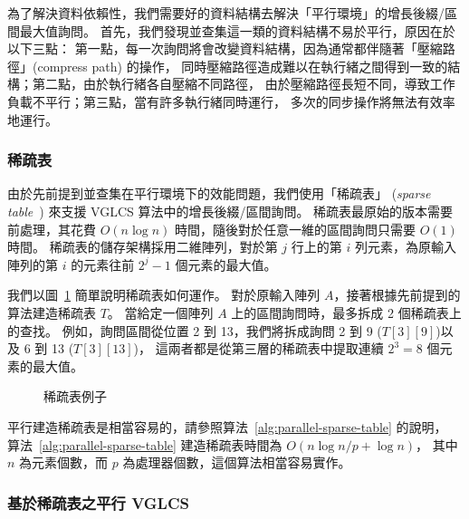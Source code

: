 為了解決資料依賴性，我們需要好的資料結構去解決「平行環境」的增長後綴/區間最大值詢問。
首先，我們發現並查集這一類的資料結構不易於平行，原因在於以下三點：
第一點，每一次詢問將會改變資料結構，因為通常都伴隨著「壓縮路徑」(compress path) 的操作，
同時壓縮路徑造成難以在執行緒之間得到一致的結構；第二點，由於執行緒各自壓縮不同路徑，
由於壓縮路徑長短不同，導致工作負載不平行；第三點，當有許多執行緒同時運行，
多次的同步操作將無法有效率地運行。

\subsubsection{稀疏表} \label{sec:sparse-table}

由於先前提到並查集在平行環境下的效能問題，我們使用「稀疏表」
({\em sparse table}~\cite{Berkman1993RecursiveSP}) 來支援 VGLCS 算法中的增長後綴/區間詢問。
稀疏表最原始的版本需要前處理，其花費 $O(n \log n)$ 時間，隨後對於任意一維的區間詢問只需要 $O(1)$ 時間。
稀疏表的儲存架構採用二維陣列，對於第 $j$ 行上的第 $i$ 列元素，為原輸入陣列的第 $i$ 的元素往前 $2^j-1$ 個元素的最大值。

我們以圖~\ref{fig:interval-decomposition} 簡單說明稀疏表如何運作。
對於原輸入陣列 $A$，接著根據先前提到的算法建造稀疏表 $T$。
當給定一個陣列 $A$ 上的區間詢問時，最多拆成 2 個稀疏表上的查找。
例如，詢問區間從位置 2 到 13，我們將拆成詢問 2 到 9 ($T[3][9]$)以及 6 到 13 ($T[3][13]$)，
這兩者都是從第三層的稀疏表中提取連續 $2^3 = 8$ 個元素的最大值。


\begin{figure}[!thb]
  \centering {} 
  \caption{稀疏表例子}
  \label{fig:interval-decomposition}
\end{figure}

平行建造稀疏表是相當容易的，請參照算法~\ref{alg:parallel-sparse-table} 的說明，
算法~\ref{alg:parallel-sparse-table} 建造稀疏表時間為 $O(n \log n / p + \log n)$，
其中 $n$ 為元素個數，而 $p$ 為處理器個數，這個算法相當容易實作。




\subsubsection{基於稀疏表之平行 VGLCS}

